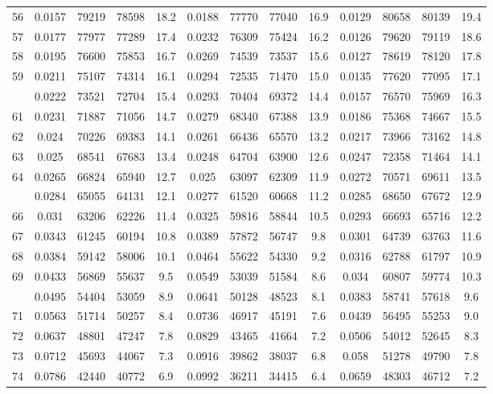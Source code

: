 \documentclass[
  14pt,
]{article}
\begin{document}
\begin{longtable}[t]{lcccccccccccc}
56 & 0.0157 & 79219 & 78598 & 18.2 & 0.0188 & 77770 & 77040 & 16.9 & 0.0129 & 80658 & 80139 & 19.4\\
57 & 0.0177 & 77977 & 77289 & 17.4 & 0.0232 & 76309 & 75424 & 16.2 & 0.0126 & 79620 & 79119 & 18.6\\
58 & 0.0195 & 76600 & 75853 & 16.7 & 0.0269 & 74539 & 73537 & 15.6 & 0.0127 & 78619 & 78120 & 17.8\\
59 & 0.0211 & 75107 & 74314 & 16.1 & 0.0294 & 72535 & 71470 & 15.0 & 0.0135 & 77620 & 77095 & 17.1\\
\addlinespace
60 & 0.0222 & 73521 & 72704 & 15.4 & 0.0293 & 70404 & 69372 & 14.4 & 0.0157 & 76570 & 75969 & 16.3\\
61 & 0.0231 & 71887 & 71056 & 14.7 & 0.0279 & 68340 & 67388 & 13.9 & 0.0186 & 75368 & 74667 & 15.5\\
62 & 0.024 & 70226 & 69383 & 14.1 & 0.0261 & 66436 & 65570 & 13.2 & 0.0217 & 73966 & 73162 & 14.8\\
63 & 0.025 & 68541 & 67683 & 13.4 & 0.0248 & 64704 & 63900 & 12.6 & 0.0247 & 72358 & 71464 & 14.1\\
64 & 0.0265 & 66824 & 65940 & 12.7 & 0.025 & 63097 & 62309 & 11.9 & 0.0272 & 70571 & 69611 & 13.5\\
\addlinespace
65 & 0.0284 & 65055 & 64131 & 12.1 & 0.0277 & 61520 & 60668 & 11.2 & 0.0285 & 68650 & 67672 & 12.9\\
66 & 0.031 & 63206 & 62226 & 11.4 & 0.0325 & 59816 & 58844 & 10.5 & 0.0293 & 66693 & 65716 & 12.2\\
67 & 0.0343 & 61245 & 60194 & 10.8 & 0.0389 & 57872 & 56747 & 9.8 & 0.0301 & 64739 & 63763 & 11.6\\
68 & 0.0384 & 59142 & 58006 & 10.1 & 0.0464 & 55622 & 54330 & 9.2 & 0.0316 & 62788 & 61797 & 10.9\\
69 & 0.0433 & 56869 & 55637 & 9.5 & 0.0549 & 53039 & 51584 & 8.6 & 0.034 & 60807 & 59774 & 10.3\\
\addlinespace
70 & 0.0495 & 54404 & 53059 & 8.9 & 0.0641 & 50128 & 48523 & 8.1 & 0.0383 & 58741 & 57618 & 9.6\\
71 & 0.0563 & 51714 & 50257 & 8.4 & 0.0736 & 46917 & 45191 & 7.6 & 0.0439 & 56495 & 55253 & 9.0\\
72 & 0.0637 & 48801 & 47247 & 7.8 & 0.0829 & 43465 & 41664 & 7.2 & 0.0506 & 54012 & 52645 & 8.3\\
73 & 0.0712 & 45693 & 44067 & 7.3 & 0.0916 & 39862 & 38037 & 6.8 & 0.058 & 51278 & 49790 & 7.8\\
74 & 0.0786 & 42440 & 40772 & 6.9 & 0.0992 & 36211 & 34415 & 6.4 & 0.0659 & 48303 & 46712 & 7.2\\

\end{longtable}
\end{document}
